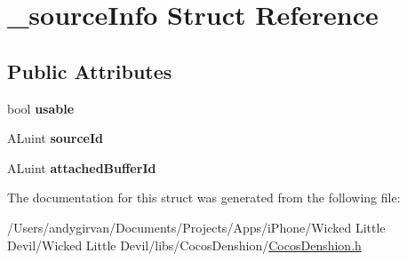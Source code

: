 \hypertarget{struct__source_info}{\section{\-\_\-source\-Info Struct Reference}
\label{struct__source_info}
}
\subsection*{Public Attributes}
\begin{DoxyCompactItemize}
\item 
\hypertarget{struct__source_info_a22f8eac8d5bdaf3f588680221397c387}{bool {\bfseries usable}}\label{struct__source_info_a22f8eac8d5bdaf3f588680221397c387}

\item 
\hypertarget{struct__source_info_a23e87c0ede21db9523ed5e8464556ea8}{A\-Luint {\bfseries source\-Id}}\label{struct__source_info_a23e87c0ede21db9523ed5e8464556ea8}

\item 
\hypertarget{struct__source_info_a377ad6280a2b4a01f996118324431259}{A\-Luint {\bfseries attached\-Buffer\-Id}}\label{struct__source_info_a377ad6280a2b4a01f996118324431259}

\end{DoxyCompactItemize}


The documentation for this struct was generated from the following file\-:\begin{DoxyCompactItemize}
\item 
/\-Users/andygirvan/\-Documents/\-Projects/\-Apps/i\-Phone/\-Wicked Little Devil/\-Wicked Little Devil/libs/\-Cocos\-Denshion/\hyperlink{_cocos_denshion_8h}{Cocos\-Denshion.\-h}\end{DoxyCompactItemize}
